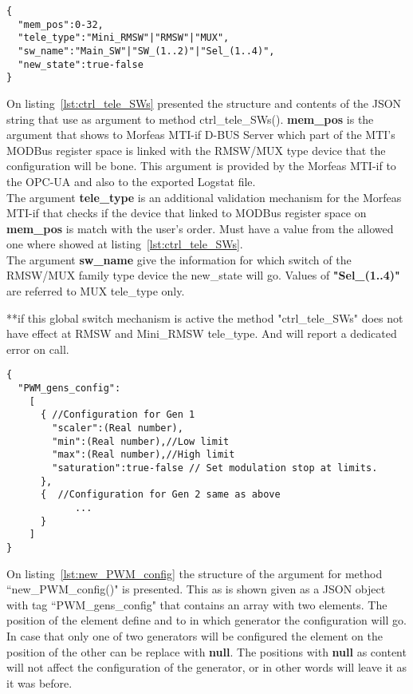 \begin{lstlisting}[frame=single,caption=Argument for ctrl\_tele\_SWs(), label=lst:ctrl_tele_SWs]
{
  "mem_pos":0-32,
  "tele_type":"Mini_RMSW"|"RMSW"|"MUX",
  "sw_name":"Main_SW"|"SW_(1..2)"|"Sel_(1..4)",
  "new_state":true-false
}
\end{lstlisting}
On listing~\ref{lst:ctrl_tele_SWs} presented the structure and contents of the JSON string that use as argument to method ctrl\_tele\_SWs().
\textbf{mem\_pos} is the argument that shows to Morfeas MTI-if D-BUS Server which part of the MTI's MODBus register space is linked with the RMSW/MUX type device that the configuration will be bone.
This argument is provided by the Morfeas MTI-if to the OPC-UA and also to the exported Logstat file.\\
The argument \textbf{tele\_type} is an additional validation mechanism for the Morfeas MTI-if that checks if the device that linked to MODBus register space on \textbf{mem\_pos} is match with the user's order.
Must have a value from the allowed one where showed at listing~\ref{lst:ctrl_tele_SWs}.\\
The argument \textbf{sw\_name} give the information for which switch of the RMSW/MUX family type device the new\_state will go. Values of \textbf{"Sel\_(1..4)"} are referred to MUX tele\_type only.

**if this global switch mechanism is active the method "ctrl\_tele\_SWs" does not have effect at RMSW and Mini\_RMSW tele\_type. And will report a dedicated error on call.

\begin{lstlisting}[frame=single,caption=Argument for new\_PWM\_config(), label=lst:new_PWM_config]
{
  "PWM_gens_config":
    [
	  { //Configuration for Gen 1
		"scaler":(Real number),
		"min":(Real number),//Low limit
		"max":(Real number),//High limit
		"saturation":true-false // Set modulation stop at limits.
	  },
	  {  //Configuration for Gen 2 same as above
            ...
	  }
    ]
}
\end{lstlisting}
On listing~\ref{lst:new_PWM_config} the structure of the argument for method ``new\_PWM\_config()" is presented.
This as is shown given as a JSON object with tag ``PWM\_gens\_config" that contains an array with two elements. The position of the element define and to in which generator the configuration will go.
In case that only one of two generators will be configured the element on the position of the other can be replace with \textbf{null}.
The positions with \textbf{null} as content will not affect the configuration of the generator, or in other words will leave it as it was before.

